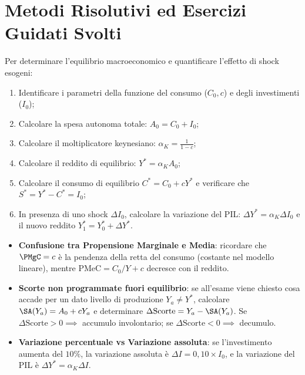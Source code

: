\section{Metodi Risolutivi ed Esercizi Guidati Svolti}

\begin{metodo}
Per determinare l'equilibrio macroeconomico e quantificare l'effetto di shock esogeni:
\begin{enumerate}
    \item Identificare i parametri della funzione del consumo ($C_0, c$) e degli investimenti ($I_0$);
    \item Calcolare la spesa autonoma totale: $A_0 = C_0 + I_0$;
    \item Calcolare il moltiplicatore keynesiano: $\alpha_K = \frac{1}{1 - c}$;
    \item Calcolare il reddito di equilibrio: $Y^* = \alpha_K A_0$;
    \item Calcolare il consumo di equilibrio $C^* = C_0 + c Y^*$ e verificare che $S^* = Y^* - C^* = I_0$;
    \item In presenza di uno shock $\Delta I_0$, calcolare la variazione del PIL: $\Delta Y^* = \alpha_K \Delta I_0$ e il nuovo reddito $Y_1^* = Y_0^* + \Delta Y^*$.
\end{enumerate}
\end{metodo}

\begin{esame}
\begin{itemize}
    \item \textbf{Confusione tra Propensione Marginale e Media}: ricordare che $\PMgC = c$ è la pendenza della retta del consumo (costante nel modello lineare), mentre $\mathrm{PMeC} = C_0/Y + c$ decresce con il reddito.
    \item \textbf{Scorte non programmate fuori equilibrio}: se all'esame viene chiesto cosa accade per un dato livello di produzione $Y_a \neq Y^*$, calcolare $\SA(Y_a) = A_0 + c Y_a$ e determinare $\Delta \mathrm{Scorte} = Y_a - \SA(Y_a)$. Se $\Delta \mathrm{Scorte} > 0 \implies$ accumulo involontario; se $\Delta \mathrm{Scorte} < 0 \implies$ decumulo.
    \item \textbf{Variazione percentuale vs Variazione assoluta}: se l'investimento aumenta del $10\%$, la variazione assoluta è $\Delta I = 0,10 \times I_0$, e la variazione del PIL è $\Delta Y^* = \alpha_K \Delta I$.
\end{itemize}
\end{esame}

